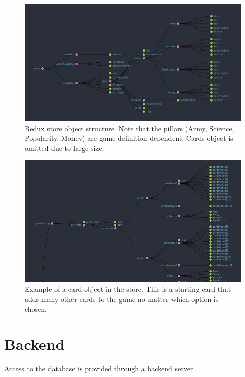 \begin{figure}[!h]
	\centering
	\includegraphics[width=1.0\textwidth]{./images/design/store_shape.png}
	\caption{Redux store object structure. Note that the pillars (Army, Science, Popularity, Money) are game definition dependent. Cards object is omitted due to large size.}
	\label{fig:store_shape}
\end{figure}

\begin{figure}[!h]
	\centering
	\includegraphics[width=1.0\textwidth]{./images/design/card_example.png}
	\caption{Example of a card object in the store. This is a starting card that adds many other cards to the game no matter which option is chosen.}
	\label{fig:card_example}
\end{figure}

\section{Backend}
Access to the database is provided through a backend server 